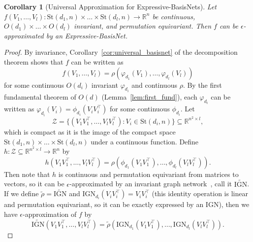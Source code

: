 \documentclass{article} \usepackage{iclr2023_conference,times}
\newcommand{\RR}{\mathbb R}
\newcommand{\mc}[1]{\mathcal{#1}}
\newcommand{\mrm}[1]{\mathrm{#1}}
\newcommand{\st}{\mrm{St}}
\newtheorem{corollary}{Corollary}
\begin{document}
\begin{corollary}[Universal Approximation for Expressive-BasisNets]
    Let $f(V_1, \ldots, V_l): \st(d_1, n) \times \ldots \times \st(d_l, n) \to \RR^n$ be continuous, $O(d_1) \times \ldots \times O(d_l)$ invariant, and permutation equivariant. Then $f$ can be $\epsilon$-approximated by an Expressive-BasisNet.
\end{corollary}
\begin{proof}
    By invariance, Corollary~\ref{cor:universal_basisnet} of the decomposition theorem shows that $f$ can be written as 
    \begin{equation}
        f(V_1, \ldots, V_l) = \rho\left(\varphi_{d_1}(V_1), \ldots, \varphi_{d_l}(V_l) \right)
    \end{equation}
    for some continuous $O(d_i)$ invariant $\varphi_{d_i}$ and continuous $\rho$. By the first fundamental theorem of $O(d)$ (Lemma~\ref{lem:first_fund}), each $\varphi_{d_i}$ can be written as $\varphi_{d_i}(V_i) = \phi_{d_i}(V_iV_i^\top)$ for some continuous $\phi_{d_i}$. Let 
    \begin{equation}
    \mc Z = \{(V_1 V_1^\top, \ldots, V_l V_l^\top) : V_i \in \st(d_i,n)\} \subseteq \RR^{n^2 \times l},
    \end{equation}
    which is compact as it is the image of the compact space $\st(d_1, n) \times \ldots \times \st(d_l, n)$ under a continuous function.
    Define $h: \mc Z \subseteq \RR^{n^2 \times l} \to \RR^n$ by 
    \begin{equation}
     h(V_1 V_1^\top, \ldots, V_l V_l^\top) = \rho\left(\phi_{d_1}(V_1 V_1^\top), \ldots, \phi_{d_l}(V_l V_l^\top) \right).
    \end{equation}
    Then note that $h$ is continuous and permutation equivariant from matrices to vectors, so it can be $\epsilon$-approximated by an invariant graph network~\citep{keriven2019universal}, call it $\widetilde{\mrm{IGN}}$. If we define $\tilde \rho = \widetilde{\mrm{IGN}}$ and $\mrm{IGN}_{d_i}(V_i V_i^\top) = V_i V_i^\top$ (this identity operation is linear and permutation equivariant, so it can be exactly expressed by an IGN), then we have $\epsilon$-approximation of $f$ by 
    \begin{equation}
        \widetilde{\mrm{IGN}}(V_1 V_1^\top, \ldots, V_l V_l^\top) = \tilde \rho\left(\mrm{IGN}_{d_1}(V_1 V_1^\top), \ldots, \mrm{IGN}_{d_l}(V_lV_l^\top) \right).
    \end{equation}
\end{proof}
\end{document}
